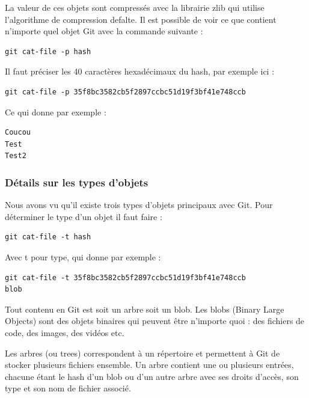 \documentclass{article}
\begin{document}
La valeur de ces objets sont compressés avec la librairie {\color{blue}zlib} qui utilise l'algorithme de compression {\color{blue}defalte}. Il est possible de voir ce que contient n'importe quel objet {\color{blue}Git} avec la commande suivante :

\begin{verbatim}
git cat-file -p hash
\end{verbatim}

Il faut préciser les 40 caractères hexadécimaux du hash, par exemple ici :


\begin{verbatim}
git cat-file -p 35f8bc3582cb5f2897ccbc51d19f3bf41e748ccb
\end{verbatim}

Ce qui donne par exemple :
\begin{verbatim}
Coucou
Test
Test2
\end{verbatim}

\subsubsection*{Détails sur les types d'objets}
Nous avons vu qu'il existe trois types d'objets principaux avec {\color{blue}Git}. Pour déterminer le type d'un objet il faut faire :

\begin{verbatim}
git cat-file -t hash
\end{verbatim}

Avec {\color{blue}t} pour type, qui donne par exemple :

\begin{verbatim}
git cat-file -t 35f8bc3582cb5f2897ccbc51d19f3bf41e748ccb
blob
\end{verbatim}


Tout contenu en {\color{blue}Git} est soit un arbre soit un {\color{blue}blob}. Les {\color{blue}blobs} ({\color{blue}Binary Large Objects}) sont des objets binaires qui peuvent être n'importe quoi : des fichiers de code, des images, des vidéos etc.

Les arbres (ou {\color{blue}trees}) correspondent à un répertoire et permettent à {\color{blue}Git} de stocker plusieurs fichiers ensemble. Un arbre contient une ou plusieurs entrées, chacune étant le {\color{blue}hash} d'un {\color{blue}blob} ou d'un autre arbre avec ses droits d'accès, son type et son nom de fichier associé.
\end{document}
